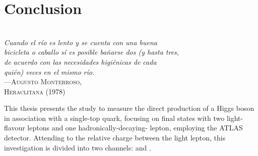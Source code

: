 \begin{comment}
%
%
asdf
\end{comment}

\chapter{Conclusion}

\label{chap:Conclusion}
\vspace*{0.1 cm} 
\hspace*{200pt} \\
\hspace*{0.25\textwidth} \textit{Cuando el río es lento y se cuenta con una buena } \\
\hspace*{0.25\textwidth} \textit{bicicleta o caballo sí es posible bañarse dos (y hasta tres, } \\
\hspace*{0.25\textwidth} \textit{de acuerdo con las necesidades higiénicas de cada } \\
\hspace*{0.25\textwidth} \textit{quién) veces en el mismo río.} \\
\hspace*{205pt} ---\textsc{Augusto Monterroso,} \\%
\hspace*{240 pt}     \textsc{Heraclitana (1978)} \\%
\vspace*{2cm} 


This thesis presents the study to measure the direct production of a Higgs boson in association
with a single-top quark, focusing on final states with two light-flavour leptons and one hadronically-decaying-\Ptau 
lepton, employing the ATLAS detector. Attending to the relative charge between the light lepton, 
this investigation is divided into two channels: \dilepOStau and \dilepSStau.

